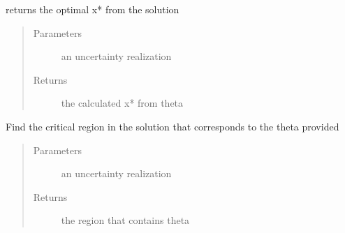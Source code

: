 \documentclass[letterpaper,10pt,english]{sphinxmanual}
\begin{document}
\begin{fulllineitems}

\begin{fulllineitems}
\label{\detokenize{mpo:mpo.solution.Solution.evaluate}}
\sphinxAtStartPar
returns the optimal x* from the solution
\begin{quote}\begin{description}
\item[{Parameters}] \leavevmode
\sphinxAtStartPar
{} \textendash{} an uncertainty realization

\item[{Returns}] \leavevmode
\sphinxAtStartPar
the calculated x* from theta

\end{description}\end{quote}

\end{fulllineitems}


\begin{fulllineitems}
\label{\detokenize{mpo:mpo.solution.Solution.get_region}}
\sphinxAtStartPar
Find the critical region in the solution that corresponds to the theta provided
\begin{quote}\begin{description}
\item[{Parameters}] \leavevmode
\sphinxAtStartPar
{} \textendash{} an uncertainty realization

\item[{Returns}] \leavevmode
\sphinxAtStartPar
the region that contains theta

\end{description}\end{quote}


\end{fulllineitems}
\end{fulllineitems}
\end{document}
